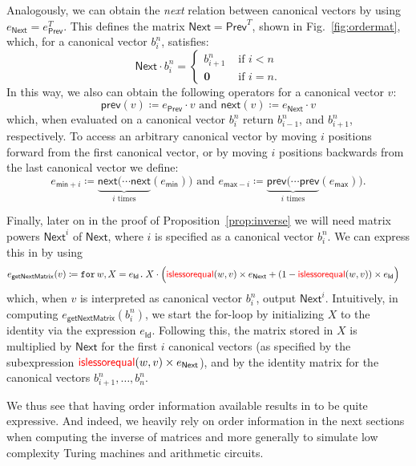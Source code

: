  
Analogously, we can obtain the \textit{next} relation between canonical vectors by using $e_{\mathsf{Next}} = e_{\mathsf{Prev}}^T$. This defines the matrix $\mathsf{Next}= \mathsf{Prev}^T$, shown in Fig.~\ref{fig:ordermat}, which, for a canonical vector $b_i^n$, satisfies:
\[
{\mathsf{Next}}\cdot b_i^n=\begin{cases}
               b_{i+1}^n & \text{ if } i < n \\
              \mathbf{0} & \text{ if } i = n.
            \end{cases}
\]
In this way, we also can obtain the following operators for a canonical vector $v$: 
$$\mathsf{prev}(v)\coloneqq e_{\mathsf{Prev}}\cdot v \text{ and }
\mathsf{next}(v)\coloneqq e_{\mathsf{Next}}\cdot v$$
which, when evaluated on a canonical vector $b_i^n$ return $b_{i-1}^n$, and $b_{i+1}^n$, respectively. 
To access an arbitrary canonical vector by moving $i$ positions forward from the first canonical vector, or by moving $i$ positions backwards from the last canonical vector we define:
\[
e_{\mathsf{min}+i}\coloneqq \underbrace{\mathsf{next}(\cdots \mathsf{next}}_{i\text{ times}}(e_{\mathsf{min}}))
\text{ and }
e_{\mathsf{max}-i}\coloneqq \underbrace{\mathsf{prev}(\cdots \mathsf{prev}}_{i\text{ times}}(e_{\mathsf{max}})).
\]

Finally, later on in the proof of Proposition~\ref{prop:inverse} we will need  matrix powers $\mathsf{Next}^i$ of $\mathsf{Next}$, where $i$ is specified as
a canonical vector $b_i^n$. We can express this in \langfor by using
\begin{align*}
e_{\mathsf{getNextMatrix}}(v)&\coloneqq \texttt{for}\, w,X = e_\mathsf{Id} \texttt{.}\,  X \cdot \Big( {\color{red} \mathsf{islessorequal}}(w,v)\times e_{\mathsf{Next}} + (1 - {\color{red} \mathsf{islessorequal}}(w,v))\times e_{\mathsf{Id}} \Big)
\end{align*}
which, when $v$ is interpreted as canonical vector $b_i^n$, output 
$\mathsf{Next}^i$. 
Intuitively, in computing  $e_{\mathsf{getNextMatrix}}(b_i^n)$, we start the for-loop by initializing $X$ to the identity via the expression $e_{\mathsf{Id}}$. Following this, the matrix stored in $X$ is multiplied by $\mathsf{Next}$ for the first $i$ canonical vectors (as specified by the subexpression ${\color{red} \mathsf{islessorequal}}(w,v)\times e_{\mathsf{Next}}$), and by the identity matrix for the canonical vectors $b_{i+1}^n, \ldots , b_n^n$. 


We thus see that having order information available results in \langfor to be quite expressive. And indeed,
we heavily rely on order information in the next sections when computing the inverse of matrices and more generally to simulate low complexity Turing machines and arithmetic circuits.


